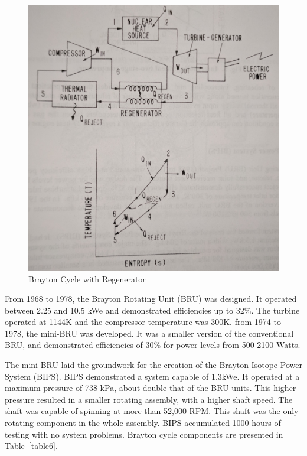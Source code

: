 \documentclass{article}
\begin{document}
\begin{figure}[]
	\centering
	\includegraphics[height=0.45\textheight]{fig/figure2}
	\caption[Brayton Cycle with Regenerator]{Brayton Cycle with Regenerator~\cite{buden2011spacebook1}}
	\label{figure2}
\end{figure}


From 1968 to 1978, the Brayton Rotating Unit (BRU) was designed. It operated between 2.25 and 10.5 kWe and demonstrated efficiencies up to 32\%. The turbine operated at 1144K and the compressor temperature was 300K. from 1974 to 1978, the mini-BRU was developed. It was a smaller version of the conventional BRU, and demonstrated efficiencies of 30\% for power levels from 500-2100 Watts. 


	The mini-BRU laid the groundwork for the creation of the Brayton Isotope Power System (BIPS). BIPS demonstrated a system capable of 1.3kWe. It operated at a maximum pressure of 738 kPa, about double that of the BRU units. This higher pressure resulted in a smaller rotating assembly, with a higher shaft speed. The shaft was capable of spinning at more than 52,000 RPM. This shaft was the only rotating component in the whole assembly. BIPS accumulated 1000 hours of testing with no system problems. Brayton cycle components are presented in Table~\ref{table6}.
\end{document}
